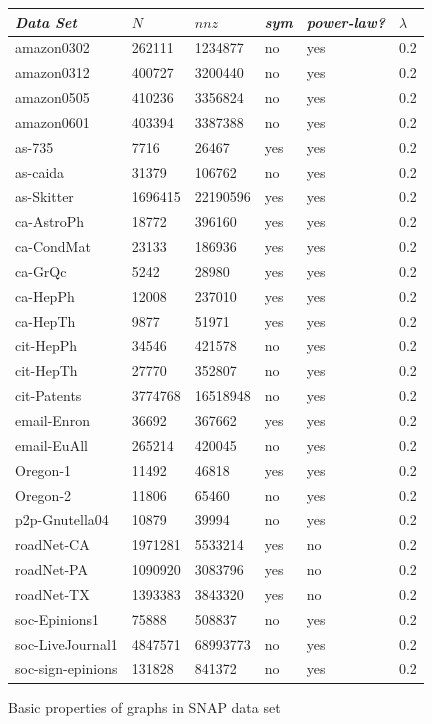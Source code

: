\documentclass[11pt]{article}
\begin{document}
{
\begin{figure}
\caption{Basic properties of graphs in SNAP data set}
\centering
\begin{tabular}{ *6l }    \toprule
\emph{Data Set} & $N$ & $nnz$ & \emph{sym} & \emph{power-law?} & $\lambda$ \\\midrule 
amazon0302 & 262111 & 1234877 & no & yes & 0.2\\ 
amazon0312 & 400727 & 3200440 & no & yes & 0.2\\ 
amazon0505 & 410236 & 3356824 & no & yes & 0.2\\ 
amazon0601 & 403394 & 3387388 & no & yes & 0.2\\ 
as-735 & 7716 & 26467 & yes & yes & 0.2\\ 
as-caida & 31379 & 106762 & no & yes & 0.2\\ 
as-Skitter & 1696415 & 22190596 & yes & yes & 0.2\\ 
ca-AstroPh & 18772 & 396160 & yes & yes & 0.2\\ 
ca-CondMat & 23133 & 186936 & yes & yes & 0.2\\ 
ca-GrQc & 5242 & 28980 & yes & yes & 0.2\\ 
ca-HepPh & 12008 & 237010 & yes & yes & 0.2\\ 
ca-HepTh & 9877 & 51971 & yes & yes & 0.2\\ 
cit-HepPh & 34546 & 421578 & no & yes & 0.2\\ 
cit-HepTh & 27770 & 352807 & no & yes & 0.2\\ 
cit-Patents & 3774768 & 16518948 & no & yes & 0.2\\ 
email-Enron & 36692 & 367662 & yes & yes & 0.2\\ 
email-EuAll & 265214 & 420045 & no & yes & 0.2\\ 
Oregon-1 & 11492 & 46818 & yes & yes & 0.2\\ 
Oregon-2 & 11806 & 65460 & no & yes & 0.2\\ 
p2p-Gnutella04 & 10879 & 39994 & no & yes & 0.2\\ 
roadNet-CA & 1971281 & 5533214 & yes & no & 0.2\\ 
roadNet-PA & 1090920 & 3083796 & yes & no & 0.2\\ 
roadNet-TX & 1393383 & 3843320 & yes & no & 0.2\\ 
soc-Epinions1 & 75888 & 508837 & no & yes & 0.2\\ 
soc-LiveJournal1 & 4847571 & 68993773 & no & yes & 0.2\\ 
soc-sign-epinions & 131828 & 841372 & no & yes & 0.2\\ 

\end{tabular}
\end{figure}}
\end{document}

